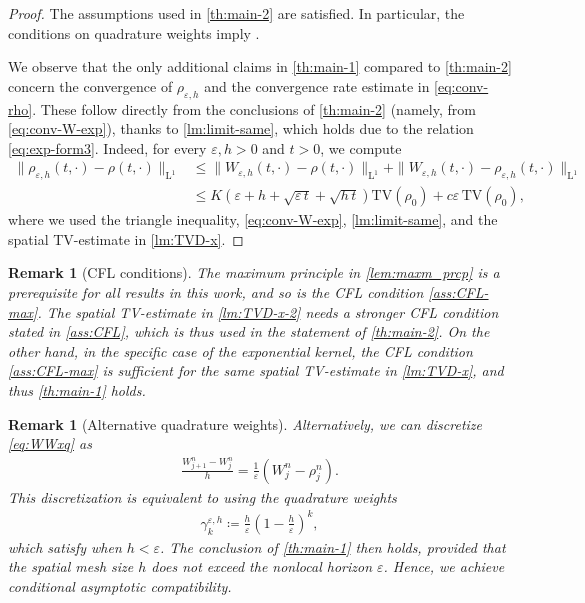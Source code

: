 \documentclass[10pt]{amsart}
\theoremstyle{plain}
\newtheorem{remark}[lemma]{Remark}
\theoremstyle{definition}
\numberwithin{equation}{section}
\newcommand{\eps}{{\varepsilon}}
\begin{document}
    
\begin{proof}
The assumptions used in \cref{th:main-2} are satisfied. In particular, the conditions  on quadrature weights imply .

We observe that the only additional claims in \cref{th:main-1} compared to \cref{th:main-2} concern the convergence of $\rho_{\varepsilon,h}$ and the convergence rate estimate in \cref{eq:conv-rho}. These follow directly from the conclusions of \cref{th:main-2} (namely, from \cref{eq:conv-W-exp}), thanks to \cref{lm:limit-same}, which holds due to the relation \cref{eq:exp-form3}. Indeed, for every $\varepsilon,h > 0$ and $t > 0$, we compute
\begin{align*}
\|\rho_{\varepsilon,h}(t,\cdot) - \rho(t,\cdot) \|_{\mathrm{L}^1}
&\le \|W_{\varepsilon,h}(t,\cdot) - \rho(t,\cdot) \|_{\mathrm{L}^1}
+ \| W_{\varepsilon,h}(t,\cdot) - \rho_{\varepsilon,h}(t,\cdot) \|_{\mathrm{L}^1} \\
&\le K\left( \varepsilon + h + \sqrt{\varepsilon\, t} + \sqrt{h\, t} \right) \mathrm{TV}(\rho_0)
+ c\varepsilon\, \mathrm{TV}(\rho_0),
\end{align*}
where we used the triangle inequality, \cref{eq:conv-W-exp}, \cref{lm:limit-same}, and the spatial TV-estimate in \cref{lm:TVD-x}.
\end{proof}

\begin{remark}[CFL conditions]\label{rk:CFL}
    The maximum principle in \cref{lem:maxm_prcp} is a prerequisite for all results in this work, and so is the CFL condition \cref{ass:CFL-max}. The spatial TV-estimate in \cref{lm:TVD-x-2} needs a stronger CFL condition stated in \cref{ass:CFL}, which is thus used in the statement of \cref{th:main-2}. 
    On the other hand, in the specific case of the exponential kernel, the CFL condition \cref{ass:CFL-max} is sufficient for the same spatial TV-estimate in \cref{lm:TVD-x}, and thus \cref{th:main-1} holds.
\end{remark}


\begin{remark}[Alternative quadrature weights] 
Alternatively, we can discretize \cref{eq:WWxq} as
\begin{align*}
    \frac{W_{j+1}^n - W_j^n}{h} = \frac1\eps (W_j^n - \rho_j^n).
\end{align*}
This discretization is equivalent to using the quadrature weights
\begin{align*}
    \gamma_k^{\eps,h} \coloneqq \frac{h}{\eps} \left( 1-\frac{h}{\eps} \right)^k,
\end{align*}
which satisfy  when $h<\eps$.
The conclusion of \cref{th:main-1} then holds, provided that the spatial mesh size $h$ does not exceed the nonlocal horizon $\varepsilon$. Hence, we achieve conditional asymptotic compatibility.
\end{remark}
\end{document}
